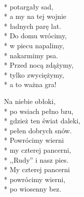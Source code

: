 \begin{lyrics}[longestline={\vin ,,Rudy'' i nasz pies.}]

\\*
potargały sad,\\*
a my na tej wojnie\\*
ładnych parę lat.\\*
\medskip
\vin Do domu wrócimy,\\*
\vin w piecu napalimy,\\*
\vin nakarmimy psa.\\*
\vin Przed nocą zdążymy,\\*
\vin tylko zwyciężymy,\\*
\vin a to ważna gra!

Na niebie obłoki,\\*
po wsiach pełno bzu,\\*
gdzież ten świat daleki,\\*
pełen dobrych snów.\\*
\medskip
\vin Powrócimy wierni\\*
\vin my czterej pancerni,\\*
\vin ,,Rudy'' i nasz pies.\\*
\vin My czterej pancerni\\*
\vin powrócimy wierni,\\*
\vin po wiosenny bez.
\end{lyrics}




